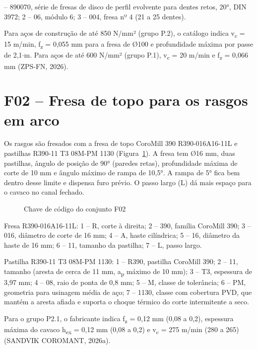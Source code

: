  – 890070, série de fresas de disco de perfil evolvente para dentes retos, 20°, DIN 3972; 2 – 06, módulo 6; 3 – 004, fresa nº 4 (21 a 25 dentes).

Para aços de construção de até 850 N/mm² (grupo P.2), o catálogo indica v\textsubscript{c} = 15 m/min, f\textsubscript{z} = 0,055 mm para a fresa de Ø100 e profundidade máxima por passe de 2,1$\cdot$m. Para aços de até 600 N/mm² (grupo P.1), v\textsubscript{c} = 20 m/min e f\textsubscript{z} = 0,066 mm (ZPS-FN, 2026).

\section{F02 – Fresa de topo para os rasgos em arco}

Os rasgos são fresados com a fresa de topo CoroMill 390 R390-016A16-11L e pastilhas R390-11 T3 08M-PM 1130 (Figura~\ref{fig:chaveF02}). A fresa tem Ø16 mm, duas pastilhas, ângulo de posição de 90° (paredes retas), profundidade máxima de corte de 10 mm e ângulo máximo de rampa de 10,5°. A rampa de 5° fica bem dentro desse limite e dispensa furo prévio. O passo largo (L) dá mais espaço para o cavaco no canal fechado.

\begin{figure}[H]
\centering
\caption{Chave de código do conjunto F02}\label{fig:chaveF02}
\par\medskip
{}
\end{figure}

\noindent Fresa R390-016A16-11L: 1 – R, corte à direita; 2 – 390, família CoroMill 390; 3 – 016, diâmetro de corte de 16 mm; 4 – A, haste cilíndrica; 5 – 16, diâmetro da haste de 16 mm; 6 – 11, tamanho da pastilha; 7 – L, passo largo.

\noindent Pastilha R390-11 T3 08M-PM 1130: 1 – R390, pastilha CoroMill 390; 2 – 11, tamanho (aresta de cerca de 11 mm, a\textsubscript{p} máximo de 10 mm); 3 – T3, espessura de 3,97 mm; 4 – 08, raio de ponta de 0,8 mm; 5 – M, classe de tolerância; 6 – PM, geometria para usinagem média de aço; 7 – 1130, classe com cobertura PVD, que mantém a aresta afiada e suporta o choque térmico do corte intermitente a seco.

Para o grupo P2.1, o fabricante indica f\textsubscript{z} = 0,12 mm (0,08 a 0,2), espessura máxima do cavaco h\textsubscript{ex} = 0,12 mm (0,08 a 0,2) e v\textsubscript{c} = 275 m/min (280 a 265) (SANDVIK COROMANT, 2026a).

